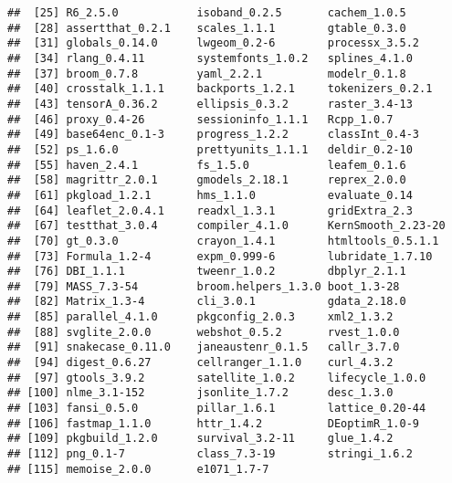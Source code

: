 \documentclass[
  12pt,
]{article}
\begin{document}
\begin{verbatim}
##  [25] R6_2.5.0            isoband_0.2.5       cachem_1.0.5       
##  [28] assertthat_0.2.1    scales_1.1.1        gtable_0.3.0       
##  [31] globals_0.14.0      lwgeom_0.2-6        processx_3.5.2     
##  [34] rlang_0.4.11        systemfonts_1.0.2   splines_4.1.0      
##  [37] broom_0.7.8         yaml_2.2.1          modelr_0.1.8       
##  [40] crosstalk_1.1.1     backports_1.2.1     tokenizers_0.2.1   
##  [43] tensorA_0.36.2      ellipsis_0.3.2      raster_3.4-13      
##  [46] proxy_0.4-26        sessioninfo_1.1.1   Rcpp_1.0.7         
##  [49] base64enc_0.1-3     progress_1.2.2      classInt_0.4-3     
##  [52] ps_1.6.0            prettyunits_1.1.1   deldir_0.2-10      
##  [55] haven_2.4.1         fs_1.5.0            leafem_0.1.6       
##  [58] magrittr_2.0.1      gmodels_2.18.1      reprex_2.0.0       
##  [61] pkgload_1.2.1       hms_1.1.0           evaluate_0.14      
##  [64] leaflet_2.0.4.1     readxl_1.3.1        gridExtra_2.3      
##  [67] testthat_3.0.4      compiler_4.1.0      KernSmooth_2.23-20 
##  [70] gt_0.3.0            crayon_1.4.1        htmltools_0.5.1.1  
##  [73] Formula_1.2-4       expm_0.999-6        lubridate_1.7.10   
##  [76] DBI_1.1.1           tweenr_1.0.2        dbplyr_2.1.1       
##  [79] MASS_7.3-54         broom.helpers_1.3.0 boot_1.3-28        
##  [82] Matrix_1.3-4        cli_3.0.1           gdata_2.18.0       
##  [85] parallel_4.1.0      pkgconfig_2.0.3     xml2_1.3.2         
##  [88] svglite_2.0.0       webshot_0.5.2       rvest_1.0.0        
##  [91] snakecase_0.11.0    janeaustenr_0.1.5   callr_3.7.0        
##  [94] digest_0.6.27       cellranger_1.1.0    curl_4.3.2         
##  [97] gtools_3.9.2        satellite_1.0.2     lifecycle_1.0.0    
## [100] nlme_3.1-152        jsonlite_1.7.2      desc_1.3.0         
## [103] fansi_0.5.0         pillar_1.6.1        lattice_0.20-44    
## [106] fastmap_1.1.0       httr_1.4.2          DEoptimR_1.0-9     
## [109] pkgbuild_1.2.0      survival_3.2-11     glue_1.4.2         
## [112] png_0.1-7           class_7.3-19        stringi_1.6.2      
## [115] memoise_2.0.0       e1071_1.7-7
\end{verbatim}
\end{document}
